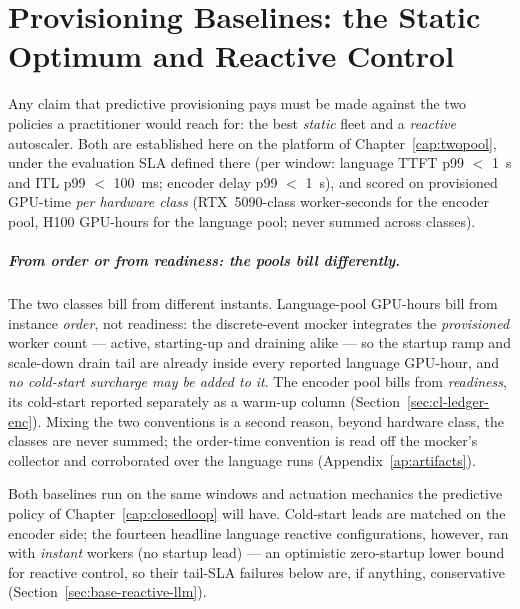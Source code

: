 \chapter{Provisioning Baselines: the Static Optimum and Reactive Control}
\label{cap:baselines}

Any claim that predictive provisioning pays must be made against the
two policies a practitioner would reach for: the best \emph{static}
fleet and a \emph{reactive} autoscaler. Both are established here on the
platform of Chapter~\ref{cap:twopool}, under the evaluation SLA
defined there (per window: language TTFT p99 $<$ \SI{1}{\second} and ITL
p99 $<$ \SI{100}{\milli\second}; encoder delay p99 $<$
\SI{1}{\second}), and scored on provisioned GPU-time \emph{per hardware
class} (RTX~5090-class worker-seconds for the encoder pool, H100
GPU-hours for the language pool; never summed across classes).

\paragraph{From order or from readiness: the pools bill differently.}
The two classes bill from different instants. Language-pool GPU-hours
bill from instance \emph{order}, not readiness: the discrete-event
mocker integrates the \emph{provisioned} worker count --- active,
starting-up and draining alike --- so the startup ramp and scale-down
drain tail are already inside every reported language GPU-hour, and
\emph{no cold-start surcharge may be added to it}. The encoder pool bills
from \emph{readiness}, its cold-start reported separately as a warm-up
column (Section~\ref{sec:cl-ledger-enc}). Mixing the two conventions is a
second reason, beyond hardware class, the classes are never summed; the
order-time convention is read off the mocker's collector and corroborated
over the language runs (Appendix~\ref{ap:artifacts}).

Both baselines run on the same windows and actuation mechanics the
predictive policy of Chapter~\ref{cap:closedloop} will have. Cold-start
leads are matched on the encoder side; the fourteen headline language
reactive configurations, however, ran with \emph{instant} workers (no
startup lead) --- an optimistic zero-startup lower bound for reactive
control, so their tail-SLA failures below are, if anything, conservative
(Section~\ref{sec:base-reactive-llm}).

